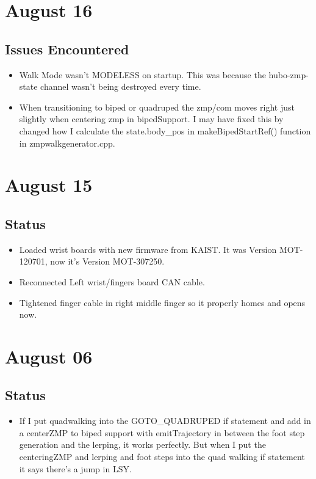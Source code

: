 \documentclass[letterpaper, 10 pt]{report}
\begin{document}
\section*{August 16}
\subsection*{Issues Encountered}
\begin{itemize}
\item Walk Mode wasn't MODELESS on startup. This was because the hubo-zmp-state channel wasn't being destroyed every time.
\item When transitioning to biped or quadruped the zmp/com moves right just slightly when centering zmp in bipedSupport. I may have fixed this by changed how I calculate the state.body\_pos in makeBipedStartRef() function in zmpwalkgenerator.cpp.
\end{itemize}

\section*{August 15}
\subsection*{Status}
\begin{itemize}
\item Loaded wrist boards with new firmware from KAIST. It was Version MOT-120701, now it's Version MOT-307250.
\item Reconnected Left wrist/fingers board CAN cable.
\item Tightened finger cable in right middle finger so it properly homes and opens now.
\end{itemize}

\section*{August 06}
\subsection*{Status}
\begin{itemize}
\item If I put quadwalking into the GOTO\_QUADRUPED if statement and add in a centerZMP to biped support with emitTrajectory in between the foot step generation and the lerping, it works perfectly. But when I put the centeringZMP and lerping and foot steps into the quad walking if statement it says there's a jump in LSY.
\end{itemize}
\end{document}
